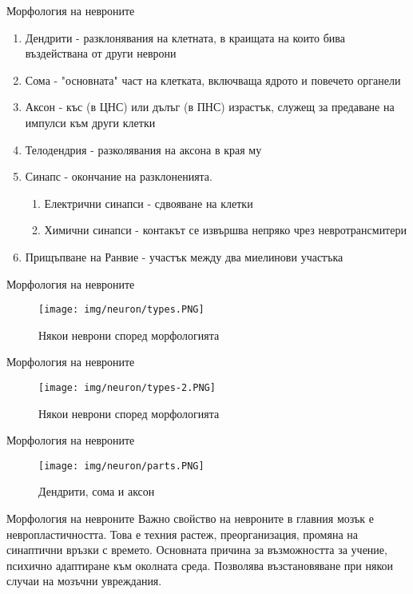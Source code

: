 \begin{frame}[t]{Морфология на невроните}
  \begin{enumerate}
    \item   Дендрити - разклонявания на клетната, в краищата на които бива въздействана от други неврони
    \item   Сома - "основната" част на клетката, включваща ядрото и повечето органели
    \item   Аксон - къс (в ЦНС) или дълъг (в ПНС) израстък, служещ за предаване на импулси към други клетки
    \item   Телодендрия - разколявания на аксона в края му
    \item   Синапс - окончание на разклоненията.
    \begin{enumerate}
      \item   Електрични синапси - сдвояване на клетки
      \item   Химични синапси - контакът се извършва непряко чрез невротрансмитери
    \end{enumerate}
    \item   Прищъпване на Ранвие - участък между два миелинови участъка
  \end{enumerate}
\end{frame}

\begin{frame}[t]{Морфология на невроните}
  \begin{figure}[htbp!]
    \centering
    \texttt{[image: img/neuron/types.PNG]}
    \caption{Някои неврони според морфологията \cite[Фиг 1.2]{Neuroscience}}
  \end{figure}
\end{frame}

\begin{frame}[t]{Морфология на невроните}
  \begin{figure}[htbp!]
    \centering
    \texttt{[image: img/neuron/types-2.PNG]}
    \caption{Някои неврони според морфологията \cite[Фиг 1.4]{Neuron}}
  \end{figure}
\end{frame}

\begin{frame}[t]{Морфология на невроните}
  \begin{figure}[htbp!]
    \centering
    \texttt{[image: img/neuron/parts.PNG]}
    \caption{Дендрити, сома и аксон \cite[Фиг 1.3]{Neuroscience}}
    \label{figure:usf}
  \end{figure}
\end{frame}

\begin{frame}[t]{Морфология на невроните}
  Важно свойство на невроните в главния мозък е невропластичността.
  Това е техния растеж, преорганизация, промяна на синаптични връзки с времето.
  Основната причина за възможността за учение, психично адаптиране към околната среда.
  Позволява възстановяване при някои случаи на мозъчни увреждания.
\end{frame}
